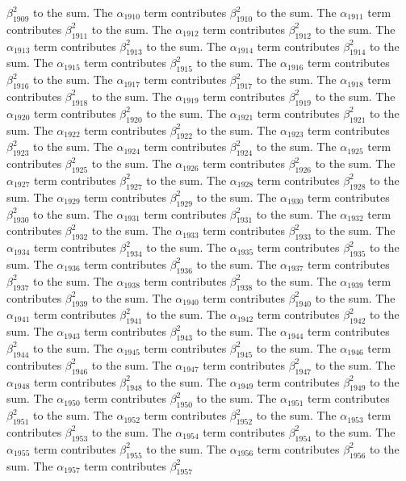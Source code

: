 \begin{lemma}
$\beta_{1909}^{2}$ to the sum. The $\alpha_{1910}$ term contributes $\beta_{1910}^{2}$ to the sum. The $\alpha_{1911}$ term contributes $\beta_{1911}^{2}$ to the sum. The $\alpha_{1912}$ term contributes $\beta_{1912}^{2}$ to the sum. The $\alpha_{1913}$ term contributes $\beta_{1913}^{2}$ to the sum. The $\alpha_{1914}$ term contributes $\beta_{1914}^{2}$ to the sum. The $\alpha_{1915}$ term contributes $\beta_{1915}^{2}$ to the sum. The $\alpha_{1916}$ term contributes $\beta_{1916}^{2}$ to the sum. The $\alpha_{1917}$ term contributes $\beta_{1917}^{2}$ to the sum. The $\alpha_{1918}$ term contributes $\beta_{1918}^{2}$ to the sum. The $\alpha_{1919}$ term contributes $\beta_{1919}^{2}$ to the sum. The $\alpha_{1920}$ term contributes $\beta_{1920}^{2}$ to the sum. The $\alpha_{1921}$ term contributes $\beta_{1921}^{2}$ to the sum. The $\alpha_{1922}$ term contributes $\beta_{1922}^{2}$ to the sum. The $\alpha_{1923}$ term contributes $\beta_{1923}^{2}$ to the sum. The $\alpha_{1924}$ term contributes $\beta_{1924}^{2}$ to the sum. The $\alpha_{1925}$ term contributes $\beta_{1925}^{2}$ to the sum. The $\alpha_{1926}$ term contributes $\beta_{1926}^{2}$ to the sum. The $\alpha_{1927}$ term contributes $\beta_{1927}^{2}$ to the sum. The $\alpha_{1928}$ term contributes $\beta_{1928}^{2}$ to the sum. The $\alpha_{1929}$ term contributes $\beta_{1929}^{2}$ to the sum. The $\alpha_{1930}$ term contributes $\beta_{1930}^{2}$ to the sum. The $\alpha_{1931}$ term contributes $\beta_{1931}^{2}$ to the sum. The $\alpha_{1932}$ term contributes $\beta_{1932}^{2}$ to the sum. The $\alpha_{1933}$ term contributes $\beta_{1933}^{2}$ to the sum. The $\alpha_{1934}$ term contributes $\beta_{1934}^{2}$ to the sum. The $\alpha_{1935}$ term contributes $\beta_{1935}^{2}$ to the sum. The $\alpha_{1936}$ term contributes $\beta_{1936}^{2}$ to the sum. The $\alpha_{1937}$ term contributes $\beta_{1937}^{2}$ to the sum. The $\alpha_{1938}$ term contributes $\beta_{1938}^{2}$ to the sum. The $\alpha_{1939}$ term contributes $\beta_{1939}^{2}$ to the sum. The $\alpha_{1940}$ term contributes $\beta_{1940}^{2}$ to the sum. The $\alpha_{1941}$ term contributes $\beta_{1941}^{2}$ to the sum. The $\alpha_{1942}$ term contributes $\beta_{1942}^{2}$ to the sum. The $\alpha_{1943}$ term contributes $\beta_{1943}^{2}$ to the sum. The $\alpha_{1944}$ term contributes $\beta_{1944}^{2}$ to the sum. The $\alpha_{1945}$ term contributes $\beta_{1945}^{2}$ to the sum. The $\alpha_{1946}$ term contributes $\beta_{1946}^{2}$ to the sum. The $\alpha_{1947}$ term contributes $\beta_{1947}^{2}$ to the sum. The $\alpha_{1948}$ term contributes $\beta_{1948}^{2}$ to the sum. The $\alpha_{1949}$ term contributes $\beta_{1949}^{2}$ to the sum. The $\alpha_{1950}$ term contributes $\beta_{1950}^{2}$ to the sum. The $\alpha_{1951}$ term contributes $\beta_{1951}^{2}$ to the sum. The $\alpha_{1952}$ term contributes $\beta_{1952}^{2}$ to the sum. The $\alpha_{1953}$ term contributes $\beta_{1953}^{2}$ to the sum. The $\alpha_{1954}$ term contributes $\beta_{1954}^{2}$ to the sum. The $\alpha_{1955}$ term contributes $\beta_{1955}^{2}$ to the sum. The $\alpha_{1956}$ term contributes $\beta_{1956}^{2}$ to the sum. The $\alpha_{1957}$ term contributes $\beta_{1957}^{2}$ 
\end{lemma}
